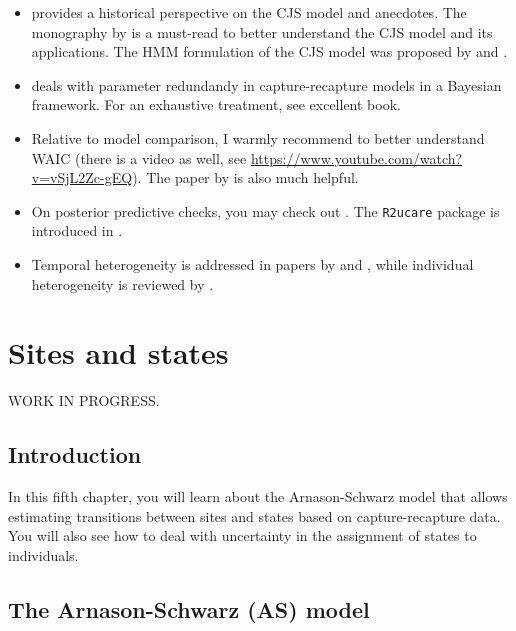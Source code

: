 \documentclass[
  12pt,
]{krantz}
\begin{document}
\begin{itemize}
\item
  \citet{buckland2016} provides a historical perspective on the CJS model and anecdotes. The monography by \citet{LebretonEtAl1992} is a must-read to better understand the CJS model and its applications. The HMM formulation of the CJS model was proposed by \citet{gimenez2007} and \citet{royle2008}.
\item
  \citet{gimenez2009} deals with parameter redundandy in capture-recapture models in a Bayesian framework. For an exhaustive treatment, see \citet{cole2020} excellent book.
\item
  Relative to model comparison, I warmly recommend \citet{mcelreathbook} to better understand WAIC (there is a video as well, see \url{https://www.youtube.com/watch?v=vSjL2Zc-gEQ}). The paper by \citet{gelman2004} is also much helpful.
\item
  On posterior predictive checks, you may check out \citet{conn2018}. The \texttt{R2ucare} package is introduced in \citet{gimenez2018r2ucare}.
\item
  Temporal heterogeneity is addressed in papers by \citet{grosbois_assessing_2008} and \citet{frederiksen2014}, while individual heterogeneity is reviewed by \citet{gimenez2018ih}.
\end{itemize}

\hypertarget{dispersal}{%
\chapter{Sites and states}\label{dispersal}}

WORK IN PROGRESS.

\hypertarget{introduction-6}{%
\section{Introduction}\label{introduction-6}}

In this fifth chapter, you will learn about the Arnason-Schwarz model that allows estimating transitions between sites and states based on capture-recapture data. You will also see how to deal with uncertainty in the assignment of states to individuals.

\hypertarget{ASmodel}{%
\section{The Arnason-Schwarz (AS) model}\label{ASmodel}}
\end{document}
